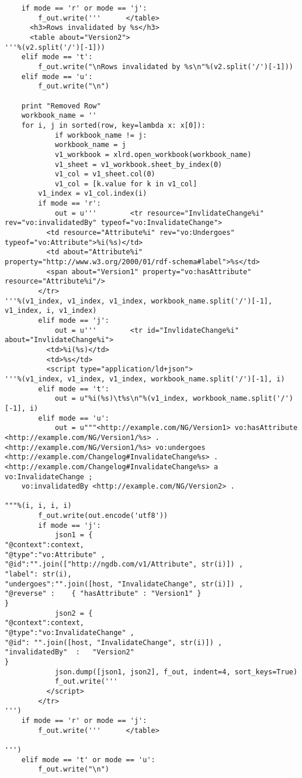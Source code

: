 \begin{verbatim}
	if mode == 'r' or mode == 'j':
		f_out.write('''      </table>
      <h3>Rows invalidated by %s</h3>
      <table about="Version2">
'''%(v2.split('/')[-1]))
	elif mode == 't':
		f_out.write("\nRows invalidated by %s\n"%(v2.split('/')[-1]))
	elif mode == 'u':
		f_out.write("\n")

	print "Removed Row"
	workbook_name = ''
	for i, j in sorted(row, key=lambda x: x[0]):
	        if workbook_name != j:
			workbook_name = j
			v1_workbook = xlrd.open_workbook(workbook_name)
			v1_sheet = v1_workbook.sheet_by_index(0)
			v1_col = v1_sheet.col(0)
			v1_col = [k.value for k in v1_col]
		v1_index = v1_col.index(i)
		if mode == 'r':
			out = u'''        <tr resource="InvlidateChange%i" rev="vo:invalidatedBy" typeof="vo:InvalidateChange">
          <td resource="Attribute%i" rev="vo:Undergoes" typeof="vo:Attribute">%i(%s)</td>
          <td about="Attribute%i" property="http://www.w3.org/2000/01/rdf-schema#label">%s</td>
          <span about="Version1" property="vo:hasAttribute" resource="Attribute%i"/>
        </tr>
'''%(v1_index, v1_index, v1_index, workbook_name.split('/')[-1], v1_index, i, v1_index)
		elif mode == 'j':
			out = u'''        <tr id="InvlidateChange%i" about="InvlidateChange%i">
          <td>%i(%s)</td>
          <td>%s</td>
          <script type="application/ld+json">
'''%(v1_index, v1_index, v1_index, workbook_name.split('/')[-1], i)
		elif mode == 't':
			out = u"%i(%s)\t%s\n"%(v1_index, workbook_name.split('/')[-1], i)
		elif mode == 'u':
			out = u"""<http://example.com/NG/Version1> vo:hasAttribute <http://example.com/NG/Version1/%s> .
<http://example.com/NG/Version1/%s> vo:undergoes <http://example.com/Changelog#InvalidateChange%s> .
<http://example.com/Changelog#InvalidateChange%s> a vo:InvalidateChange ;
	vo:invalidatedBy <http://example.com/NG/Version2> .

"""%(i, i, i, i)
		f_out.write(out.encode('utf8'))
		if mode == 'j':
			json1 = {
"@context":context,
"@type":"vo:Attribute" ,
"@id":"".join(["http://ngdb.com/v1/Attribute", str(i)]) ,
"label": str(i),
"undergoes":"".join([host, "InvalidateChange", str(i)]) ,
"@reverse" :    { "hasAttribute" : "Version1" }
}
			json2 = {
"@context":context,
"@type":"vo:InvalidateChange" ,
"@id": "".join([host, "InvalidateChange", str(i)]) ,
"invalidatedBy"  :   "Version2"
}
			json.dump([json1, json2], f_out, indent=4, sort_keys=True)
			f_out.write('''
          </script>
        </tr>
''')
	if mode == 'r' or mode == 'j':
		f_out.write('''      </table>

''')
	elif mode == 't' or mode == 'u':
		f_out.write("\n")



\end{verbatim}

